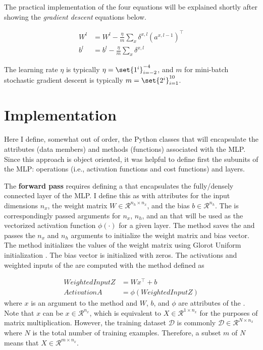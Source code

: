 \documentclass{article}
\DeclarePairedDelimiter\set\{\}
\begin{document}
The practical implementation of the four equations will be explained shortly
after showing the \textit{gradient descent} equations below.

\begin{align}
	W^{l} & = W^{l} - \frac{\eta}{m} \sum_{x}{\delta^{x, l}(a^{x, l-1})^\top} \\
	b^{l} & = b^{l} - \frac{\eta}{m} \sum_{x}{\delta^{x, l}}
\end{align}

The learning rate $\eta$ is typically $\eta = \set{1^{i}}_{i=-2}^{-4}$, and $m$
for mini-batch stochastic gradient descent is typically
$m = \set{2^{i}}_{i=1}^{10}$.

\section{Implementation}

\quad Here I define, somewhat out of order, the Python classes
that will encapsulate the attributes (data members) and methods (functions) associated
with the MLP. Since this approach is object oriented, it was helpful to
define first the subunits of the MLP: operations (i.e., activation functions and
cost functions) and layers.

The \textbf{forward pass} requires defining a  that
encapsulates the fully/densely connected layer of the MLP. I define this as
 with attributes for the input dimensions $n_x$,
the weight matrix $W \in \mathcal{R}^{n_h \times n_x}$, and the bias
$b \in \mathcal{R}^{n_h}$. The  is correspondingly passed
arguments for $n_x$, $n_h$, and an 
that will be used as the vectorized activation function $\phi(\cdot)$ for a given layer.
The  method saves the  and passes
the $n_x$ and $n_h$ arguments to initialize the weight matrix and bias vector.
The  method initializes the values of the weight matrix
using Glorot Uniform initialization \cite{Glorot2010}. The bias vector is
initialized with zeros. The activations and weighted inputs of the 
are computed with the  method defined as

\begin{align}
	WeightedInputZ & = Wx^{\top} + b        \\
	ActivationA    & = \phi(WeightedInputZ)
\end{align}
where $x$ is an argument to the  method and
$W$, $b$, and $\phi$ are attributes of the .
Note that $x$ can be $x \in \mathcal{R}^{n_x}$, which
is equivalent to $X \in \mathcal{R}^{1 \times n_x}$ for the purposes of matrix
multiplication. However, the training dataset $\mathcal{D}$ is commonly
$\mathcal{D} \in \mathcal{R}^{N \times n_x}$ where $N$ is the total number of
training examples. Therefore, a subset $m$ of $N$ means that
$X \in \mathcal{R}^{m \times n_x}$.
\end{document}
